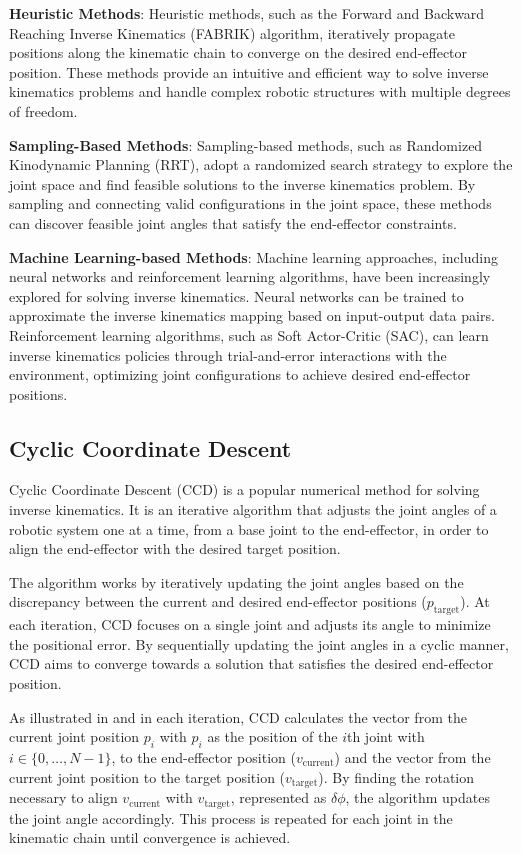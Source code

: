 \textbf{Heuristic Methods}: Heuristic methods, such as the Forward and Backward Reaching Inverse Kinematics (FABRIK) algorithm, iteratively propagate positions along the kinematic chain to converge on the desired end-effector position. These methods provide an intuitive and efficient way to solve inverse kinematics problems and handle complex robotic structures with multiple degrees of freedom.

\textbf{Sampling-Based Methods}: Sampling-based methods, such as Randomized Kinodynamic Planning (RRT), adopt a randomized search strategy to explore the joint space and find feasible solutions to the inverse kinematics problem. By sampling and connecting valid configurations in the joint space, these methods can discover feasible joint angles that satisfy the end-effector constraints.

\textbf{Machine Learning-based Methods}: Machine learning approaches, including neural networks and reinforcement learning algorithms, have been increasingly explored for solving inverse kinematics. Neural networks can be trained to approximate the inverse kinematics mapping based on input-output data pairs. Reinforcement learning algorithms, such as Soft Actor-Critic (SAC), can learn inverse kinematics policies through trial-and-error interactions with the environment, optimizing joint configurations to achieve desired end-effector positions.

\subsection{Cyclic Coordinate Descent}

Cyclic Coordinate Descent (CCD) is a popular numerical method for solving inverse kinematics. It is an iterative algorithm that adjusts the joint angles of a robotic system one at a time, from a base joint to the end-effector, in order to align the end-effector with the desired target position.

The algorithm works by iteratively updating the joint angles based on the discrepancy between the current and desired end-effector positions ($p_\text{target}$). At each iteration, CCD focuses on a single joint and adjusts its angle to minimize the positional error. By sequentially updating the joint angles in a cyclic manner, CCD aims to converge towards a solution that satisfies the desired end-effector position.



As illustrated in  and  in each iteration, CCD calculates the vector from the current joint position $p_i$ with $p_i$ as the position of the $i$th joint with $i \in \{0, \ldots, N-1\}$, to the end-effector position ($v_\text{current}$) and the vector from the current joint position to the target position ($v_\text{target}$). By finding the rotation necessary to align $v_\text{current}$ with $v_\text{target}$, represented as $\delta\phi$, the algorithm updates the joint angle accordingly. This process is repeated for each joint in the kinematic chain until convergence is achieved.

